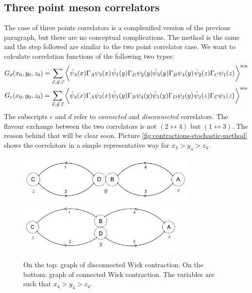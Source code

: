 \documentclass[english, LaM, oneside, noexaminfo]{sapthesis}
\begin{document}
\subsection*{Three point meson correlators}
\noindent
The case of three points correlators is a complexified version of the previous paragraph, but there are no conceptual complications.
The method is the same and the step followed are similar to the two point correlator case.
We want to calculate correlation functions of the following two types:
\begin{equation}\label{eq:GdGc-strategy}
    \begin{gathered}
        G_d(x_0,y_0,z_0) = \sum_{\vec x, \vec y, \vec z} \bigg\langle
        \bar\psi_4(x) \Gamma_A \psi_3 (x)\hspace*{.3mm}
        \bar\psi_1(y) \Gamma_D \psi_2 (y) \bar\psi_3(y) \Gamma_B \psi_4 (y)\hspace*{.3mm}
        \bar\psi_2(z) \Gamma_C \psi_1 (z)\hspace*{.3mm}
        \bigg\rangle^{\text{sea}}\\
        G_c(x_0,y_0,z_0) = \sum_{\vec x, \vec y, \vec z} \bigg\langle
        \bar\psi_4(x) \Gamma_A \psi_3 (x)\hspace*{.3mm}
        \bar\psi_1(y) \Gamma_B \psi_4 (y) \bar\psi_3(y) \Gamma_D \psi_2 (y)\hspace*{.3mm}
        \bar\psi_2(z) \Gamma_C \psi_1 (z)\hspace*{.3mm}
        \bigg\rangle^{\text{sea}}\\
    \end{gathered}
\end{equation}
The subscripts $c$ and $d$ refer to {\it connected} and {\it disconnected} correlators.
The flavour exchange between the two correlators is not $(2\leftrightarrow 4)$ but $(1\leftrightarrow 3)$.
The reason behind that will be clear soon.
Picture \ref{fig:contractions-stochastic-method} shows the correlators in a simple representative way for $x_4>y_4>z_4$.
\begin{figure}[h!]
    \centering
    \includegraphics[width=0.8\textwidth]{imgs-MSc-thesis/Wick_stochastic_disc.png}
    \includegraphics[width=0.75\textwidth]{imgs-MSc-thesis/Wick_stochastic_conn.png}
    \caption{On the top: graph of disconnected Wick contraction. On the bottom: graph of connected Wick contraction. The variables are such that $x_4 > y_4 > z_4$.}
\end{figure}\label{fig:contractions-stochastic-method}
\end{document}
